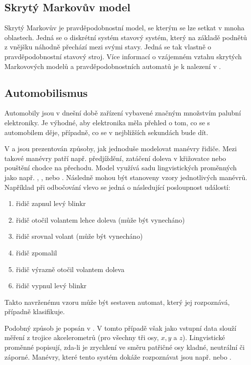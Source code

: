 \documentclass[a4paper,10pt]{article}
\begin{document}
\subsection{Skrytý Markovův model}
Skrytý Markovův je pravděpodobnostní model, se kterým se lze setkat v mnoha oblastech. Jedná se o diskrétní systém stavový systém, který na základě podnětů z vnějšku náhodně přechází mezi svými stavy. Jedná se tak vlastně o pravděpodobnostní stavový stroj. Více informací o vzájemném vztahu skrytých Markovových modelů a pravděpodobnostních automatů je k nalezení v \cite{DupDenEsp-LiProAuHidMarMod+}.

\subsection{Automobilismus}
Automobily jsou v dnešní době zařízení vybavené značným množstvím palubní elektroniky. Je výhodné, aby elektronika měla přehled o tom, co se s automobilem děje, případně, co se v nejbližších sekundách bude dít.

V \cite{Hul+-ManRecUsProFinStaMacFuzLog} a \cite{TriHei-ExpDesSeqFuzPer} jsou prezentován způsoby, jak jednoduše modelovat manévry řidiče. Mezi takové manévry patří např. předjíždění, zatáčení doleva v křižovatce nebo pouštění chodce na přechodu. Model využívá sadu lingvistických proměnných jako např. , ,  nebo . Následně mohou být stanoveny vzory jednotlivých manévrů. Například při odbočování vlevo se jedná o následující posloupnost událostí:
\begin{enumerate}
 \item řidič zapnul levý blinkr
 \item řidič otočil volantem lehce doleva (může být vynecháno)
 \item řidič srovnal volant (může být vynecháno)
 \item řidič zpomalil
 \item řidič výrazně otočil volantem doleva
 \item řidič vypnul levý blinkr
\end{enumerate}

Takto navrženému vzoru může být sestaven automat, který jej rozpoznává, případně klasifikuje.

Podobný způsob je popsán v \cite{Hul+-ManRecUsProFinStaMacFuzLog}. V tomto případě však jako vstupní data slouží měření z trojice akcelerometrů (pro všechny tři osy, $x, y$ a $z$). Lingvistické proměnné popisují, zda-li je zrychlení ve směru patřičné osy kladné, neutrální či záporné. Manévry, které tento systém dokáže rozpoznávat jsou např.  nebo .
\end{document}
